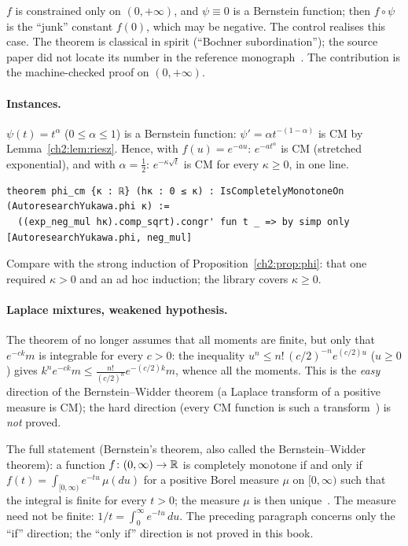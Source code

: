 \begin{remark}
$f$ is constrained only on $(0,+\infty)$, and $\psi\equiv0$ is a Bernstein function; then $f\circ\psi$ is the ``junk''
constant $f(0)$, which may be negative. The control  realises this case. The theorem is
classical in spirit (``Bochner subordination''); the source paper did not locate its number in the
reference monograph~\cite{ch2ssv}. The contribution is the machine-checked proof on $(0,+\infty)$.
\end{remark}

\paragraph{Instances.} $\psi(t)=t^\alpha$ ($0\le\alpha\le1$) is a Bernstein function: $\psi'=\alpha t^{-(1-\alpha)}$ is CM
by Lemma~\ref{ch2:lem:riesz}. Hence, with $f(u)=e^{-au}$: $e^{-at^\alpha}$ is CM (stretched exponential), and with
$\alpha=\frac12$: $e^{-\kappa\sqrt t}$ is CM for every $\kappa\ge0$, in one line.
\begin{leanbox}
\begin{lstlisting}[style=chdeux]
theorem phi_cm {κ : ℝ} (hκ : 0 ≤ κ) : IsCompletelyMonotoneOn (AutoresearchYukawa.phi κ) :=
  ((exp_neg_mul hκ).comp_sqrt).congr' fun t _ => by simp only [AutoresearchYukawa.phi, neg_mul]
\end{lstlisting}
\end{leanbox}
\noindent Compare with the strong induction of Proposition~\ref{ch2:prop:phi}: that one required $\kappa>0$ and an
ad hoc induction; the library covers $\kappa\ge0$.

\paragraph{Laplace mixtures, weakened hypothesis.} The theorem  of  no longer
assumes that all moments are finite, but only that $e^{-ck}m$ is integrable for every $c>0$: the inequality
$u^n\le n!\,(c/2)^{-n}e^{(c/2)u}$ ($u\ge0$) gives $k^ne^{-ck}m\le\frac{n!}{(c/2)^n}e^{-(c/2)k}m$, whence all the
moments. This is the \emph{easy} direction of the Bernstein--Widder theorem (a Laplace transform of a positive
measure is CM); the hard direction (every CM function is such a transform~\cite{widder}) is
\emph{not} proved.
\begin{uniremark}\tierL{} The full statement (Bernstein's theorem, also called the Bernstein--Widder theorem): a
function $f\colon(0,\infty)\to\mathbb{R}$ is completely monotone if and only if $f(t)=\int_{[0,\infty)}e^{-tu}\,\mu(du)$ for
a positive Borel measure $\mu$ on $[0,\infty)$ such that the integral is finite for every $t>0$; the measure $\mu$ is
then unique~\cite{bernstein,widder}. The measure need not be finite: $1/t=\int_0^\infty e^{-tu}\,du$. The preceding paragraph concerns only the ``if''
direction; the ``only if'' direction is not proved in this book.
\end{uniremark}


